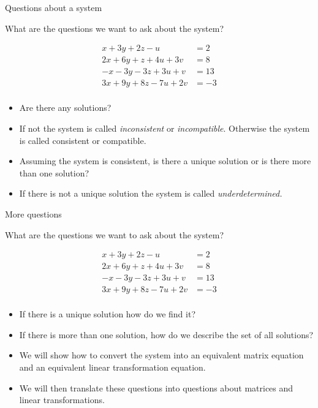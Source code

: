 \documentclass{beamer}
\begin{document}
\begin{frame}{Questions about a system}

What are the questions we want to ask about the system?

\begin{align*}
 x + 3y + 2z - u  \qquad &= 2 \\
2x + 6y + z + 4u + 3v  &= 8 \\
-x -3y  -3z + 3u + v  &= 13 \\
3x + 9y + 8z  -7u + 2v  &= -3 \\
\end{align*}

\begin{itemize}
\item Are there any solutions?
\item If not the system is called \emph{inconsistent}
or \emph{incompatible}. Otherwise the system is called consistent or compatible.
\item Assuming the system is consistent, is there a unique solution or is there
more than one solution?
\item If there is not a unique solution the system is
called \emph{underdetermined.}
\end{itemize}

\end{frame}

\begin{frame}{More questions}

What are the questions we want to ask about the system?

\begin{align*}
 x + 3y + 2z - u  \qquad &= 2 \\
2x + 6y + z + 4u + 3v  &= 8 \\
-x -3y  -3z + 3u + v  &= 13 \\
3x + 9y + 8z  -7u + 2v  &= -3 \\
\end{align*}

\begin{itemize}
\item If there is a unique solution how do we find it?
\item If there is more than one solution, how do we describe the set of
all solutions?
\item We will show how to convert the system into an equivalent
matrix equation and an equivalent linear transformation equation.
\item We will then translate these questions into questions about
matrices and linear transformations.
\end{itemize}

\end{frame}
\end{document}
